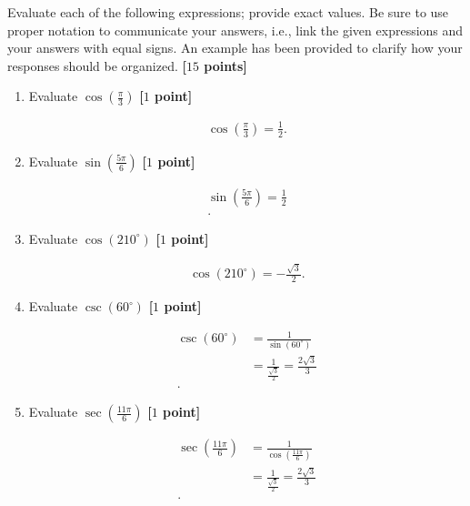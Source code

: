 \begin{problem}
  Evaluate each of the following expressions; provide exact values. Be
  sure to use proper notation to communicate your answers, i.e., link the
  given expressions and your answers with equal signs. An example has been
  provided to clarify how your responses should be organized. \textbf{[$15$ points]}

    \begin{enumerate}
      \item Evaluate $\cos \left(\frac{\pi}{3}\right)$ \textbf{[$1$ point]}

        \begin{align*}
          \cos \left(\frac{\pi}{3}\right) = \frac{1}{2}
        .\end{align*}

      \item Evaluate $\sin \left(\frac{5\pi}{6}\right)$ \textbf{[$1$ point]}

        \begin{align*}
          \sin \left(\frac{5\pi}{6}\right) = \frac{1}{2} \\
        .\end{align*}

      \item Evaluate $\cos (210^{\circ})$ \textbf{[$1$ point]}

        \begin{align*}
          \cos (210^{\circ}) = -\frac{\sqrt{3}}{2}
        .\end{align*}

      \item Evaluate $\csc (60^{\circ})$ \textbf{[$1$ point]}

        \begin{align*}
          \csc (60^{\circ}) &= \frac{1}{\sin (60^{\circ})} \\
                            &= \frac{1}{\frac{\sqrt{3}}{2}} = \frac{2\sqrt{3}}{3} \\
        .\end{align*}

      \item Evaluate $\sec \left(\frac{11\pi}{6}\right)$ \textbf{[$1$ point]}

        \begin{align*}
          \sec \left(\frac{11\pi}{6}\right) &= \frac{1}{\cos \left(\frac{11\pi}{6}\right)} \\
                                            &= \frac{1}{\frac{\sqrt{3}}{2}} = \frac{2\sqrt{3}}{3} \\
        .\end{align*}


\end{enumerate}
\end{problem}
